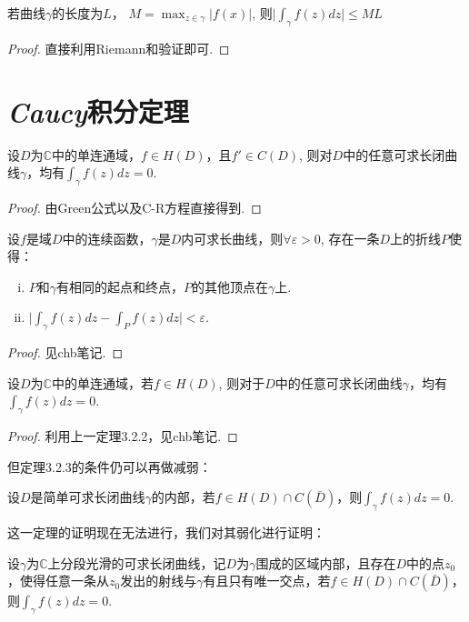 \begin{mypro}[长大不等式]
	
	若曲线$\gamma$的长度为$L$， $M = \max_{z \in \gamma} \vert f(x) \vert$,
	则$ \vert \int_\gamma  f(z) dz \vert \leq ML$
\end{mypro}
\begin{proof}
	直接利用Riemann和验证即可.
\end{proof}

\section{\emph{Caucy}积分定理}
\begin{mypro}
	设$D$为$\mathbb{C}$中的单连通域，$f \in H(D)$，且$f' \in C(D)$, 则对$D$中的任意可求长闭曲线$\gamma$，均有$\int_\gamma f(z) dz = 0$.
\end{mypro}
\begin{proof}
	由Green公式以及C-R方程直接得到.
\end{proof}

\begin{mypro}
	设$f$是域$D$中的连续函数，$\gamma$是$D$内可求长曲线，则$\forall \varepsilon > 0$, 存在一条$D$上的折线$P$使得：
	\begin{enumerate}[(i)]
		\item $P$和$\gamma$有相同的起点和终点，$P$的其他顶点在$\gamma$上.
		\item $\vert \int_\gamma f(z) dz - \int_Pf(z) dz \vert < \varepsilon $.
	\end{enumerate}
\end{mypro}
\begin{proof}
	见chb笔记.
\end{proof}

\begin{mypro}
	设$D$为$\mathbb C$中的单连通域，若$f \in H(D)$, 则对于$D$中的任意可求长闭曲线$\gamma$，均有$\int_\gamma f(z) dz = 0$.
\end{mypro}
\begin{proof}
	利用上一定理3.2.2，见chb笔记.
\end{proof}

但定理3.2.3的条件仍可以再做减弱：
\begin{mypro}
	设$D$是简单可求长闭曲线$\gamma$的内部，若$f \in H(D) \cap C(\bar{D})$，则$\int_\gamma f(z) dz = 0$.
\end{mypro}
这一定理的证明现在无法进行，我们对其弱化进行证明：

\addtocounter{mypro}{-1}
\begin{mypro}[*]
	设$\gamma$为$\mathbb{C}$上分段光滑的可求长闭曲线，记$D$为$\gamma$围成的区域内部，且存在$D$中的点$z_0$，使得任意一条从$z_0$发出的射线与$\gamma$有且只有唯一交点，若$f \in H(D) \cap C(\bar{D})$，则$\int_\gamma f(z) dz = 0$.
\end{mypro}

